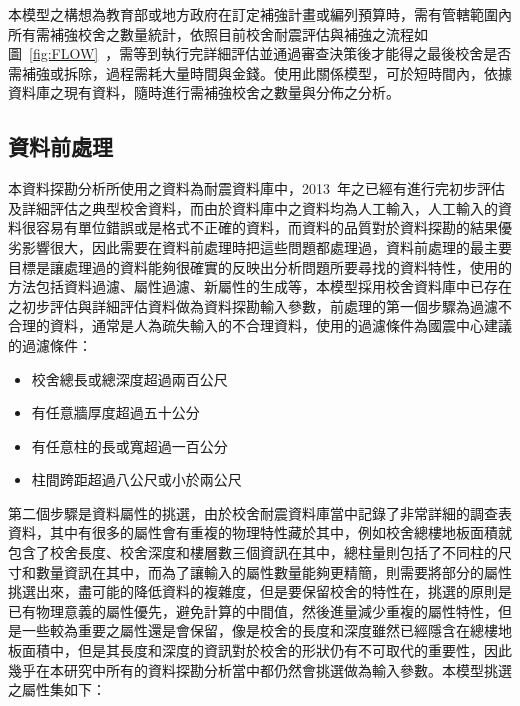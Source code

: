 本模型之構想為教育部或地方政府在訂定補強計畫或編列預算時，需有管轄範圍內所有需補強校舍之數量統計，依照目前校舍耐震評估與補強之流程如圖~\ref{fig:FLOW}~，需等到執行完詳細評估並通過審查決策後才能得之最後校舍是否需補強或拆除，過程需耗大量時間與金錢。使用此關係模型，可於短時間內，依據資料庫之現有資料，隨時進行需補強校舍之數量與分佈之分析。

\subsection{資料前處理}

本資料探勘分析所使用之資料為耐震資料庫中，2013~年之已經有進行完初步評估及詳細評估之典型校舍資料，而由於資料庫中之資料均為人工輸入，人工輸入的資料很容易有單位錯誤或是格式不正確的資料，而資料的品質對於資料探勘的結果優劣影響很大，因此需要在資料前處理時把這些問題都處理過，資料前處理的最主要目標是讓處理過的資料能夠很確實的反映出分析問題所要尋找的資料特性，使用的方法包括資料過濾、屬性過濾、新屬性的生成等，本模型採用校舍資料庫中已存在之初步評估與詳細評估資料做為資料探勘輸入參數，前處理的第一個步驟為過濾不合理的資料，通常是人為疏失輸入的不合理資料，使用的過濾條件為國震中心建議的過濾條件：

\begin{itemize}
\item 校舍總長或總深度超過兩百公尺
\item 有任意牆厚度超過五十公分
\item 有任意柱的長或寬超過一百公分
\item 柱間跨距超過八公尺或小於兩公尺
\end{itemize}

第二個步驟是資料屬性的挑選，由於校舍耐震資料庫當中記錄了非常詳細的調查表資料，其中有很多的屬性會有重複的物理特性藏於其中，例如校舍總樓地板面積就包含了校舍長度、校舍深度和樓層數三個資訊在其中，總柱量則包括了不同柱的尺寸和數量資訊在其中，而為了讓輸入的屬性數量能夠更精簡，則需要將部分的屬性挑選出來，盡可能的降低資料的複雜度，但是要保留校舍的特性在，挑選的原則是已有物理意義的屬性優先，避免計算的中間值，然後進量減少重複的屬性特性，但是一些較為重要之屬性還是會保留，像是校舍的長度和深度雖然已經隱含在總樓地板面積中，但是其長度和深度的資訊對於校舍的形狀仍有不可取代的重要性，因此幾乎在本研究中所有的資料探勘分析當中都仍然會挑選做為輸入參數。本模型挑選之屬性集如下：

